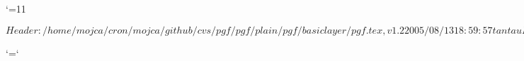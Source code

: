 %

\edef\pgfatcode{\the\catcode`\@}
\catcode`\@=11



\ProvidesPackageRCS $Header: /home/mojca/cron/mojca/github/cvs/pgf/pgf/plain/pgf/basiclayer/pgf.tex,v 1.2 2005/08/13 18:59:57 tantau Exp $







\catcode`\@=\pgfatcode

\endinput
